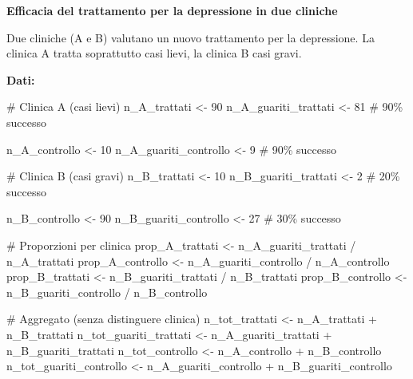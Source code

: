 \documentclass[
  letterpaper,
  DIV=11,
  numbers=noendperiod,
  oneside]{scrreprt}
\newenvironment{Shaded}{\begin{snugshade}}{\end{snugshade}}
\newcommand{\CommentTok}[1]{\textcolor[rgb]{0.37,0.37,0.37}{#1}}
\newcommand{\DecValTok}[1]{\textcolor[rgb]{0.68,0.00,0.00}{#1}}
\newcommand{\NormalTok}[1]{\textcolor[rgb]{0.00,0.23,0.31}{#1}}
\newcommand{\OtherTok}[1]{\textcolor[rgb]{0.00,0.23,0.31}{#1}}
\newcommand{\SpecialCharTok}[1]{\textcolor[rgb]{0.37,0.37,0.37}{#1}}
\theoremstyle{definition}
\theoremstyle{plain}
\theoremstyle{definition}
\theoremstyle{remark}
\begin{document}
\begin{tcolorbox}[enhanced jigsaw, arc=.35mm, breakable, colbacktitle=quarto-callout-note-color!10!white, opacityback=0, toprule=.15mm, rightrule=.15mm, colback=white, opacitybacktitle=0.6, leftrule=.75mm, coltitle=black, bottomtitle=1mm, left=2mm, toptitle=1mm, title=\textcolor{quarto-callout-note-color}{\faInfo}\hspace{0.5em}{Esempio}, titlerule=0mm, bottomrule=.15mm, colframe=quarto-callout-note-color-frame]

\textbf{Efficacia del trattamento per la depressione in due cliniche}

Due cliniche (A e B) valutano un nuovo trattamento per la depressione.
La clinica A tratta soprattutto casi lievi, la clinica B casi gravi.

\textbf{Dati:}

\begin{Shaded}
\begin{Highlighting}[]
\CommentTok{\# Clinica A (casi lievi)}
\NormalTok{n\_A\_trattati }\OtherTok{\textless{}{-}} \DecValTok{90}
\NormalTok{n\_A\_guariti\_trattati }\OtherTok{\textless{}{-}} \DecValTok{81}   \CommentTok{\# 90\% successo}

\NormalTok{n\_A\_controllo }\OtherTok{\textless{}{-}} \DecValTok{10}
\NormalTok{n\_A\_guariti\_controllo }\OtherTok{\textless{}{-}} \DecValTok{9}   \CommentTok{\# 90\% successo}

\CommentTok{\# Clinica B (casi gravi)}
\NormalTok{n\_B\_trattati }\OtherTok{\textless{}{-}} \DecValTok{10}
\NormalTok{n\_B\_guariti\_trattati }\OtherTok{\textless{}{-}} \DecValTok{2}    \CommentTok{\# 20\% successo}

\NormalTok{n\_B\_controllo }\OtherTok{\textless{}{-}} \DecValTok{90}
\NormalTok{n\_B\_guariti\_controllo }\OtherTok{\textless{}{-}} \DecValTok{27}  \CommentTok{\# 30\% successo}

\CommentTok{\# Proporzioni per clinica}
\NormalTok{prop\_A\_trattati }\OtherTok{\textless{}{-}}\NormalTok{ n\_A\_guariti\_trattati }\SpecialCharTok{/}\NormalTok{ n\_A\_trattati}
\NormalTok{prop\_A\_controllo }\OtherTok{\textless{}{-}}\NormalTok{ n\_A\_guariti\_controllo }\SpecialCharTok{/}\NormalTok{ n\_A\_controllo}
\NormalTok{prop\_B\_trattati }\OtherTok{\textless{}{-}}\NormalTok{ n\_B\_guariti\_trattati }\SpecialCharTok{/}\NormalTok{ n\_B\_trattati}
\NormalTok{prop\_B\_controllo }\OtherTok{\textless{}{-}}\NormalTok{ n\_B\_guariti\_controllo }\SpecialCharTok{/}\NormalTok{ n\_B\_controllo}

\CommentTok{\# Aggregato (senza distinguere clinica)}
\NormalTok{n\_tot\_trattati }\OtherTok{\textless{}{-}}\NormalTok{ n\_A\_trattati }\SpecialCharTok{+}\NormalTok{ n\_B\_trattati}
\NormalTok{n\_tot\_guariti\_trattati }\OtherTok{\textless{}{-}}\NormalTok{ n\_A\_guariti\_trattati }\SpecialCharTok{+}\NormalTok{ n\_B\_guariti\_trattati}
\NormalTok{n\_tot\_controllo }\OtherTok{\textless{}{-}}\NormalTok{ n\_A\_controllo }\SpecialCharTok{+}\NormalTok{ n\_B\_controllo}
\NormalTok{n\_tot\_guariti\_controllo }\OtherTok{\textless{}{-}}\NormalTok{ n\_A\_guariti\_controllo }\SpecialCharTok{+}\NormalTok{ n\_B\_guariti\_controllo}


\end{Highlighting}
\end{Shaded}
\end{tcolorbox}
\end{document}
